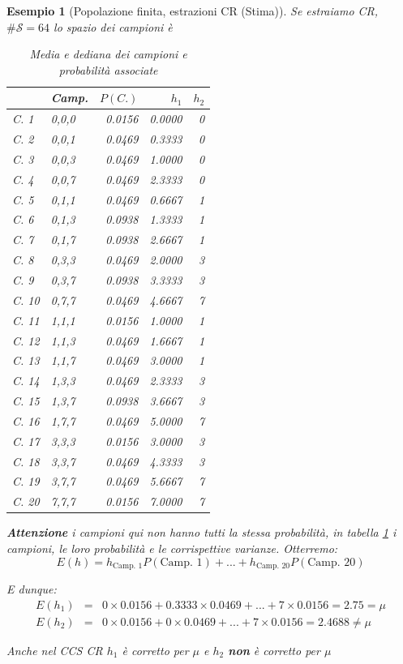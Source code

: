 \documentclass[
  11pt,
]{book}
\theoremstyle{mytheoremstyle}
\theoremstyle{mydefstyle}
\newtheorem{example}{{Esempio}}[section]
\newenvironment{att}
  {
\begin{tcolorbox}[enhanced,arc=0.1mm,boxrule=1pt,colback=white,colframe=ared,title=\bf\small \fontfamily{lmss}\selectfont \faExclamationTriangle \hspace{.5 cm} Attenzione,drop fuzzy shadow]
}{
\end{tcolorbox}
  }
\begin{document}
\begin{example}[Popolazione finita, estrazioni CR (Stima)]
\leavevmode

Se estraiamo CR, \(\#\mathcal{S}=64\) lo spazio dei campioni è

\begin{table}[!h]
\centering
\caption{\label{tab:stima-cr}Media e dediana dei campioni e probabilità associate}
\centering
\fontsize{8}{10}\selectfont
\begin{tabular}[t]{llrrr}
\toprule
  & Camp. & $P(C.)$ & $h_1$ & $h_2$\\
\midrule
C. 1 & 0,0,0 & 0.0156 & 0.0000 & 0\\
C. 2 & 0,0,1 & 0.0469 & 0.3333 & 0\\
C. 3 & 0,0,3 & 0.0469 & 1.0000 & 0\\
C. 4 & 0,0,7 & 0.0469 & 2.3333 & 0\\
C. 5 & 0,1,1 & 0.0469 & 0.6667 & 1\\
\addlinespace
C. 6 & 0,1,3 & 0.0938 & 1.3333 & 1\\
C. 7 & 0,1,7 & 0.0938 & 2.6667 & 1\\
C. 8 & 0,3,3 & 0.0469 & 2.0000 & 3\\
C. 9 & 0,3,7 & 0.0938 & 3.3333 & 3\\
C. 10 & 0,7,7 & 0.0469 & 4.6667 & 7\\
\addlinespace
C. 11 & 1,1,1 & 0.0156 & 1.0000 & 1\\
C. 12 & 1,1,3 & 0.0469 & 1.6667 & 1\\
C. 13 & 1,1,7 & 0.0469 & 3.0000 & 1\\
C. 14 & 1,3,3 & 0.0469 & 2.3333 & 3\\
C. 15 & 1,3,7 & 0.0938 & 3.6667 & 3\\
\addlinespace
C. 16 & 1,7,7 & 0.0469 & 5.0000 & 7\\
C. 17 & 3,3,3 & 0.0156 & 3.0000 & 3\\
C. 18 & 3,3,7 & 0.0469 & 4.3333 & 3\\
C. 19 & 3,7,7 & 0.0469 & 5.6667 & 7\\
C. 20 & 7,7,7 & 0.0156 & 7.0000 & 7\\
\bottomrule
\end{tabular}
\end{table}

\begin{att}
\textbf{Attenzione} i campioni qui non hanno tutti la stessa probabilità, in tabella \ref{tab:stima-cr} i campioni, le loro probabilità e le corrispettive varianze. Otterremo:
\[E(h)=h_\text{Camp. 1}P(\text{Camp. 1})+...+h_\text{Camp. 20}P(\text{Camp. 20})\]

E dunque:
\begin{eqnarray*}
  E(h_1)  &=& 0\times0.0156+0.3333\times0.0469+...+7\times0.0156 = 2.75=\mu\\
  E(h_2)  &=& 0\times0.0156+0\times0.0469+...+7\times0.0156 = 2.4688\neq\mu
\end{eqnarray*}

\end{att}

Anche nel CCS CR \(h_1\) è corretto per \(\mu\) e \(h_2\) \textbf{non} è corretto per \(\mu\)

\end{example}
\end{document}
